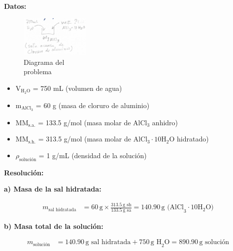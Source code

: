 \documentclass{article}
\begin{document}
\begin{multicols}{2} %

\noindent\textbf{Datos:} %

\begin{figure}[H]
    \begin{minipage}[t]{0.3\textwidth} %
        \raggedright %
        \includegraphics[width=\linewidth, height=2cm]{./problema5_diagrama.png} %
        \caption{Diagrama del \\ problema}
    \end{minipage}
\end{figure}

\begin{itemize}
\item V$_{\text{H}_2\text{O}}$ = 750 mL (volumen de agua)
\item m$_{\text{AlCl}_3}$ = 60 g (masa de cloruro de aluminio)
\item MM$_{\text{s.a.}}$ = 133.5 g/mol (masa molar de AlCl$_3$ anhidro)
\item MM$_{\text{s.h.}}$ = 313.5 g/mol (masa molar de AlCl$_3\cdot10\text{H}_2\text{O}$ hidratado)
\item $\rho_{\text{solución}}$ = 1 g/mL (densidad de la solución)
\end{itemize}

\columnbreak %

\noindent\textbf{Resolución:} %

\textbf{a) Masa de la sal hidratada:}

\begin{align*}
    m_{\text{sal hidratada}} &= 60 \, \text{g} \times \frac{313.5 \, \text{g sh}}{133.5 \, \text{g sa}} = 140.90 \, \text{g (AlCl}_3 \cdot 10\text{H}_2\text{O)}
\end{align*}

\textbf{b) Masa total de la solución:}

\begin{align*}
    m_{\text{solución}} &= 140.90 \, \text{g sal hidratada} + 750 \, \text{g H}_2\text{O} = 890.90 \, \text{g solución}
\end{align*}


\end{multicols}
\end{document}
